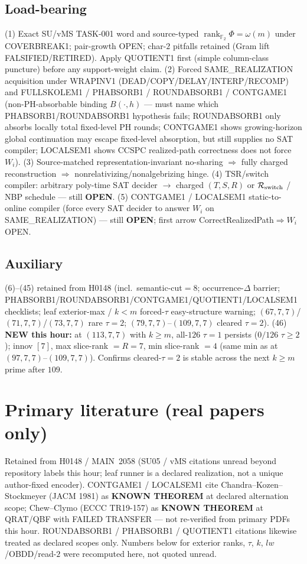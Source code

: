 \documentclass[11pt]{article}
\begin{document}
\subsection*{Load-bearing}
(1) Exact SU/vMS TASK-001 word and source-typed
$\operatorname{rank}_{\mathbb F_2}\Phi=\omega(m)$ under COVERBREAK1; pair-growth OPEN;
char-$2$ pitfalls retained (Gram lift FALSIFIED/RETIRED). Apply QUOTIENT1 first
(simple column-class puncture) before any support-weight claim.
(2) Forced SAME\_REALIZATION acquisition under WRAPINV1
(DEAD/COPY/DELAY/INTERP/RECOMP) and FULLSKOLEM1 / PHABSORB1 / ROUNDABSORB1 / CONTGAME1
(non-PH-absorbable binding $B(\cdot,h)$ --- must name which PHABSORB1/ROUNDABSORB1
hypothesis fails; ROUNDABSORB1 only absorbs locally total fixed-level PH rounds;
CONTGAME1 shows growing-horizon global continuation may escape fixed-level absorption,
but still supplies no SAT compiler; LOCALSEM1 shows CCSPC realized-path correctness
does not force $W_i$).
(3) Source-matched representation-invariant no-sharing $\Rightarrow$ fully charged reconstruction
$\Rightarrow$ nonrelativizing/nonalgebrizing hinge.
(4) TSR/switch compiler: arbitrary poly-time SAT decider $\to$ charged $(T,S,R)$ or
$\mathcal R_{\rm switch}$ / NBP schedule --- still \textbf{OPEN}.
(5) CONTGAME1 / LOCALSEM1 static-to-online compiler (force every SAT decider to answer $W_i$ on
SAME\_REALIZATION) --- still \textbf{OPEN}; first arrow CorrectRealizedPath$\Rightarrow W_i$ OPEN.

\subsection*{Auxiliary}
(6)--(45) retained from H0148 (incl.\ semantic-cut$=8$; occurrence-$\Delta$ barrier;
PHABSORB1/ROUNDABSORB1/CONTGAME1/QUOTIENT1/LOCALSEM1 checklists; leaf exterior-max / $k{<}m$ forced-$\tau$ easy-structure warning;
$(67,7,7)$/$(71,7,7)$/$(73,7,7)$ rare $\tau{=}2$; $(79,7,7)$--$(109,7,7)$ cleared $\tau{=}2$).
(46) \textbf{NEW this hour:} at $(113,7,7)$ with $k{\ge}m$, all-$126$ $\tau{=}1$ persists
($0/126$ $\tau{\ge}2$); innov $[7]$, max slice-rank $=R{=}7$, min slice-rank $=4$
(same min as at $(97,7,7)$--$(109,7,7)$). Confirms cleared-$\tau{=}2$
is stable across the next $k{\ge}m$ prime after $109$.

\section*{Primary literature (real papers only)}
Retained from H0148 / MAIN~2058 (SU05 / vMS citations unread beyond repository labels this hour;
leaf runner is a declared realization, not a unique author-fixed encoder).
CONTGAME1 / LOCALSEM1 cite Chandra--Kozen--Stockmeyer (JACM 1981) as \textbf{KNOWN THEOREM}
at declared alternation scope; Chew--Clymo (ECCC TR19-157) as \textbf{KNOWN THEOREM} at
QRAT/QBF with FAILED TRANSFER --- not re-verified from primary PDFs this hour.
ROUNDABSORB1 / PHABSORB1 / QUOTIENT1 citations likewise treated as declared scopes only.
Numbers below for exterior ranks, $\tau$, $k$, $lw$/OBDD/read-$2$
were recomputed here, not quoted unread.
\end{document}

